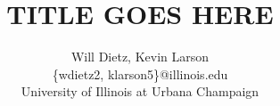 \documentclass[letterpaper,twocolumn,12pt]{article}
\title{TITLE GOES HERE}
\author{Will Dietz, Kevin Larson\\
\{wdietz2, klarson5\}@illinois.edu\\
University of Illinois at Urbana Champaign}
\date{}
\begin{document}
\maketitle







\footnotesize



\newpage

\end{document}
